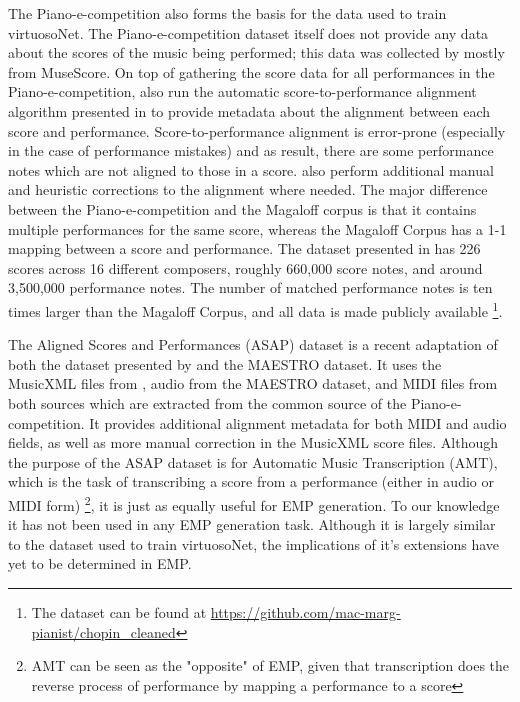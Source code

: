 The Piano-e-competition also forms the basis for the data used to train virtuosoNet. The Piano-e-competition dataset itself does not provide any data about the scores of the music being performed; this data was collected by \citet{jeong2019virtuosonet} mostly from MuseScore. On top of gathering the score data for all performances in the Piano-e-competition, \citet{jeong2019virtuosonet} also run the automatic score-to-performance alignment algorithm presented in \cite{nakamura2017performance} to provide metadata about the alignment between each score and performance. Score-to-performance alignment is error-prone (especially in the case of performance mistakes) and as result, there are some performance notes which are not aligned to those in a score. \citet{jeong2019virtuosonet} also perform additional manual and heuristic corrections to the alignment where needed. The major difference between the Piano-e-competition and the Magaloff corpus is that it contains multiple performances for the same score, whereas the Magaloff Corpus has a 1-1 mapping between a score and performance. The dataset presented in \cite{jeong2019virtuosonet} has 226 scores across 16 different composers, roughly 660,000 score notes, and around 3,500,000 performance notes. The number of matched performance notes is ten times larger than the Magaloff Corpus, and all data is made publicly available \footnote{The dataset can be found at \url{https://github.com/mac-marg-pianist/chopin_cleaned}}. 

The Aligned Scores and Performances (ASAP) dataset \cite{foscarin2020asap} is a recent adaptation of both the dataset presented by \citet{jeong2019virtuosonet} and the MAESTRO dataset. It uses the MusicXML files from \citet{jeong2019virtuosonet}, audio from the MAESTRO dataset, and MIDI files from both sources which are extracted from the common source of the Piano-e-competition. It provides additional alignment metadata for both MIDI and audio fields, as well as more manual correction in the MusicXML score files. Although the purpose of the ASAP dataset is for Automatic Music Transcription (AMT), which is the task of transcribing a score from a performance (either in audio or MIDI form) \footnote{AMT can be seen as the "opposite" of EMP, given that transcription does the reverse process of performance by mapping a performance to a score}, it is just as equally useful for EMP generation. To our knowledge it has not been used in any EMP generation task. Although it is largely similar to the dataset used to train virtuosoNet, the implications of it's extensions have yet to be determined in EMP. 
